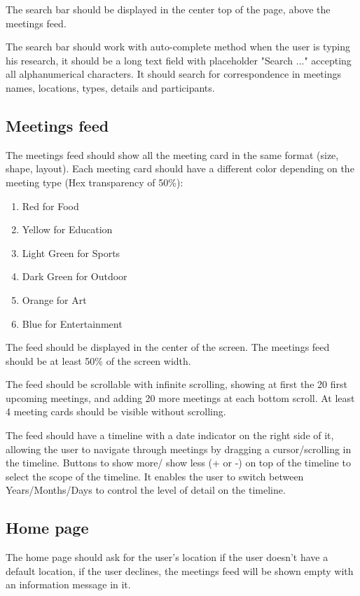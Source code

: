 \documentclass[conference]{IEEEtran}
\begin{document}
The search bar should be displayed in the center top of the page, above the meetings feed.

The search bar should work with auto-complete method when the user is typing his research, it should be a long text field with placeholder "Search ..." accepting all alphanumerical characters.
It should search for correspondence in meetings names, locations, types, details and participants.

\subsection{Meetings feed}

The meetings feed should show all the meeting card in the same format (size, shape, layout).
Each meeting card should have a different color depending on the meeting type (Hex transparency of 50\%):

\begin{enumerate}
    \item Red for Food
    \item Yellow for Education
    \item Light Green for Sports
    \item Dark Green for Outdoor
    \item Orange for Art
    \item Blue for Entertainment
\end{enumerate}

The feed should be displayed in the center of the screen.
The meetings feed should be at least 50\% of the screen width.

The feed should be scrollable with infinite scrolling, showing at first the 20 first upcoming meetings, and adding 20 more meetings at each bottom scroll.
At least 4 meeting cards should be visible without scrolling.

The feed should have a timeline with a date indicator on the right side of it, allowing the user to navigate through meetings by dragging a cursor/scrolling in the timeline.
Buttons to show more/ show less (+ or -) on top of the timeline to select the scope of the timeline.
It enables the user to switch between Years/Months/Days to control the level of detail on the timeline.

\subsection{Home page}

The home page should ask for the user's location if the user doesn't have a default location, if the user declines, the meetings feed will be shown empty with an information message in it.
\end{document}
